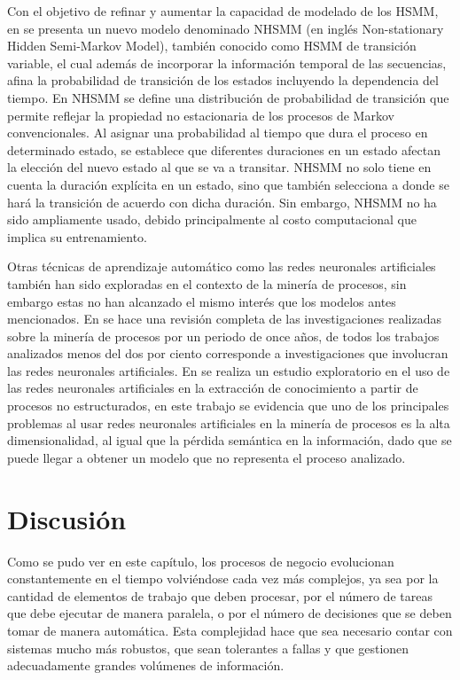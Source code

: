 Con el objetivo de refinar y aumentar la capacidad de modelado de los HSMM, en \cite{Marhasev2006} se presenta un nuevo modelo denominado NHSMM (en inglés Non-stationary Hidden Semi-Markov Model), también conocido como HSMM de transición variable, el cual además de incorporar la información temporal de las secuencias, afina la probabilidad de transición de los estados incluyendo la dependencia del tiempo. En NHSMM se define una distribución de probabilidad de transición que permite reflejar la propiedad no estacionaria de los procesos de Markov convencionales. Al asignar una probabilidad al tiempo que dura el proceso en determinado estado, se establece que diferentes duraciones en un estado afectan la elección del nuevo estado al que se va a transitar. NHSMM no solo tiene en cuenta la duración explícita en un estado, sino que también selecciona a donde se hará la transición de acuerdo con dicha duración. Sin embargo, NHSMM no ha sido ampliamente usado, debido principalmente al costo computacional que implica su entrenamiento.

Otras técnicas de aprendizaje automático como las redes neuronales artificiales también han sido exploradas en el contexto de la minería de procesos, sin embargo estas no han alcanzado el mismo interés que los modelos antes mencionados. En \cite{Maita2015} se hace una revisión completa de las investigaciones realizadas sobre la minería de procesos por un periodo de once años, de todos los trabajos analizados menos del dos por ciento corresponde a investigaciones que involucran las redes neuronales artificiales. En \cite{Maita2017} se realiza un estudio exploratorio en el uso de las redes neuronales artificiales en la extracción de conocimiento a partir de procesos no estructurados, en este trabajo se evidencia que uno de los principales problemas al usar redes neuronales artificiales en la minería de procesos es la alta dimensionalidad, al igual que la pérdida semántica en la información, dado que se puede llegar a obtener un modelo que no representa el proceso analizado.

\section{Discusión} %
\label{section1.4}

Como se pudo ver en este capítulo, los procesos de negocio evolucionan constantemente en el tiempo volviéndose cada vez más complejos, ya sea por la cantidad de elementos de trabajo que deben procesar, por el número de tareas que debe ejecutar de manera paralela, o por el número de decisiones que se deben tomar de manera automática. Esta complejidad hace que sea necesario contar con sistemas mucho más robustos, que sean tolerantes a fallas y que gestionen adecuadamente grandes volúmenes de información. 

